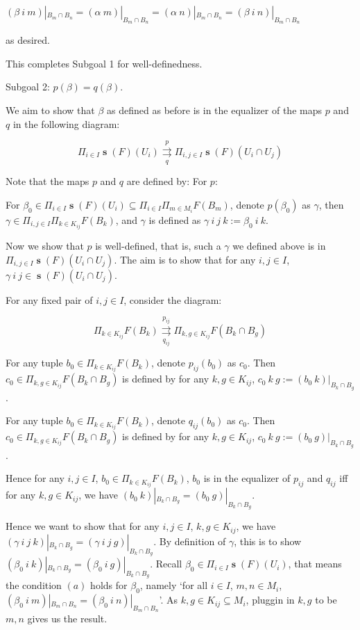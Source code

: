 \documentclass[a4paper]{article}
\DeclareMathOperator{\s}{\mathbf s}
\begin{document}
$(\beta \ i \ m)|_{B_m\cap B_n}=(\alpha\ m)|_{B_m\cap B_n}=(\alpha \ n)|_{B_m\cap B_n}= (\beta \ i \ n)|_{B_m\cap B_n}$

as desired.

This completes Subgoal 1 for well-definedness.

Subgoal 2: $p(\beta)=q(\beta)$.

We aim to show that $\beta$ as defined as before is in the equalizer of the maps $p$ and $q$ in the following diagram:

\[\Pi_{i\in I}\s(F)(U_i)\overset{p}{\underset{q}\rightrightarrows}\Pi_{i,j\in I}\s(F)(U_i\cap U_j)\]

Note that the maps $p$ and $q$ are defined by:\newline
For $p$:

For $\beta_0\in \Pi_{i\in I}\s(F)(U_i)\subseteq \Pi_{i\in I}\Pi_{m\in M_i}F(B_m)$, denote $p(\beta_0)$ as $\gamma$, then $\gamma\in \Pi_{i,j\in I}\Pi_{k\in K_{ij}}F(B_k)$, and $\gamma$ is defined as $\gamma \ i \ j \ k :=\beta_0 \ i \ k$. 

Now we show that $p$ is well-defined, that is, such a $\gamma$ we defined above is in $\Pi_{i,j\in I}\s(F)(U_i\cap U_j)$. The aim is to show that for any $i,j\in I$, $\gamma \ i \ j \in \s(F)(U_i\cap U_j)$. 

For any fixed pair of $i,j\in I$, consider the diagram:

\[\Pi_{k\in K_{ij}}F(B_k)\overset{p_{ij}}{\underset{q_{ij}}\rightrightarrows}\Pi_{k,g\in K_{ij}}F(B_k\cap B_g)\]

For any tuple $b_0\in \Pi_{k\in K_{ij}}F(B_k)$, denote $p_{ij}(b_0)$ as $c_0$. Then $c_0\in \Pi_{k,g\in K_{ij}}F(B_k\cap B_g)$ is defined by for any $k,g\in K_{ij}$, $c_0\ k \ g := (b_0\ k)|_{B_k\cap B_g}$.


For any tuple $b_0\in \Pi_{k\in K_{ij}}F(B_k)$, denote $q_{ij}(b_0)$ as $c_0$. Then $c_0\in \Pi_{k,g\in K_{ij}}F(B_k\cap B_g)$ is defined by for any $k,g\in K_{ij}$, $c_0\ k \ g := (b_0\ g)|_{B_k\cap B_g}$.

Hence for any $i,j\in I$, $b_0\in \Pi_{k\in K_{ij}}F(B_k)$, $b_0$ is in the equalizer of $p_{ij}$ and $q_{ij}$ iff for any $k,g\in K_{ij}$, we have $(b_0\ k)|_{B_k\cap B_g}=(b_0\ g)|_{B_k\cap B_g}$.

Hence we want to show that for any $i,j\in I$, $k,g\in K_{ij}$, we have $(\gamma\ i \ j \ k)|_{B_k\cap B_g}=(\gamma \ i \ j \ g)|_{B_k\cap B_g}$. By definition of $\gamma$, this is to show $(\beta_0\ i \ k)|_{B_k\cap B_g} = (\beta_0 \ i \ g)|_{B_k\cap B_g}$. Recall $\beta_0\in \Pi_{i\in I}\s(F)(U_i)$, that means the condition $(a)$ holds for $\beta_0$, namely `for all $i\in I$, $m,n\in M_i$, $(\beta_0 \ i \ m)|_{B_m\cap B_n}=(\beta_0\ i \ n)|_{B_m\cap B_n}$'. As $k,g\in K_{ij}\subseteq M_i$, pluggin in $k,g$ to be $m,n$ gives us the result.
\end{document}
